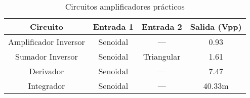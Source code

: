 \begin{table}[H]
  \centering
  \caption{Circuitos amplificadores prácticos}\label{tab:amplificadores_practico}
  \begin{tabular}{cccc}
    \toprule
    \textbf{Circuito} & \textbf{Entrada 1} & \textbf{Entrada 2} & \textbf{Salida (Vpp)} \\
    \midrule
    Amplificador Inversor  & Senoidal & ---         & 0.93    \\
    Sumador Inversor       & Senoidal & Triangular & 1.61   \\
    Derivador              & Senoidal & ---         & 7.47 \\
    Integrador             & Senoidal & ---         & 40.33m \\
    \bottomrule
  \end{tabular}
\end{table}